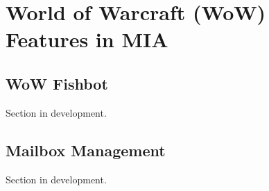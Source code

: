 \chapter{World of Warcraft (WoW) Features in MIA} \label{WoW}
\pagestyle{fancy}

\section{WoW Fishbot} \label{WoWFishbot}

Section in development.

\section{Mailbox Management} \label{WoWMailbox}

Section in development.